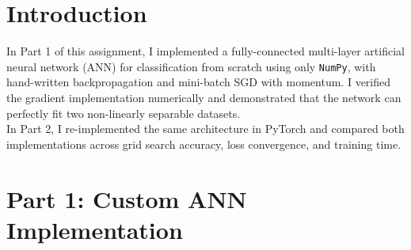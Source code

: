 \documentclass[fleqn,moreauthors,10pt]{ds_report}
\affiliation{\textit{dn98183@student.uni-lj.si}}
\begin{document}
\flushbottom
\maketitle
\thispagestyle{empty}


\section*{Introduction}
In Part 1 of this assignment, I implemented a fully-connected multi-layer artificial
neural network (ANN) for classification from scratch using only \texttt{NumPy},
with hand-written backpropagation and mini-batch SGD with momentum. I verified the
gradient implementation numerically and demonstrated that the network can perfectly
fit two non-linearly separable datasets.
\vspace{0.2cm}
\\
In Part 2, I re-implemented the same architecture in PyTorch and compared both
implementations across grid search accuracy, loss convergence, and training time.


\section*{Part 1: Custom ANN Implementation}
\end{document}
